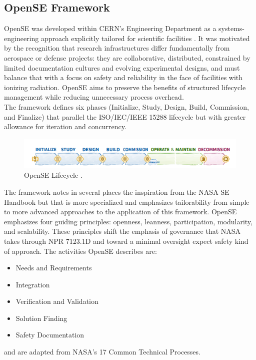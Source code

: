 \subsection{OpenSE Framework}
\label{sub:opense}
OpenSE was developed within CERN’s Engineering Department as a systems-engineering approach explicitly tailored for scientific facilities \cite{cern2016opense,bonnal2018opense}. 
It was motivated by the recognition that research infrastructures differ fundamentally from aerospace or defense projects: they are collaborative, distributed, constrained by limited documentation cultures and evolving experimental designs, and must balance that with a focus on safety and reliability in the face of facilities with ionizing radiation. 
OpenSE aims to preserve the benefits of structured lifecycle management while reducing unnecessary process overhead.\\
The framework defines six phases (Initialize, Study, Design, Build, Commission, and Finalize) that parallel the ISO/IEC/IEEE 15288 lifecycle but with greater allowance for iteration and concurrency. \\
\begin{figure}[h]
  \centering
  \includegraphics[width=0.9\linewidth]{figures/openSElifecycle.png}
  \caption{OpenSE Lifecycle
  \cite{cern2016opense}.}
  \label{fig:openSE_lifecycle}
\end{figure}

The framework notes in several places the inspiration from the NASA SE Handbook but that is more specialized and emphasizes tailorability from simple to more advanced approaches to the application of this framework. \cite{cern2016opense}
OpenSE emphasizes four guiding principles: openness, leanness, participation, modularity, and scalability.\cite{cern2016opense}
These principles shift the emphasis of governance that NASA takes through NPR 7123.1D \cite{npr7123.1D} and toward a minimal oversight expect safety kind of approach. The activities OpenSE describes are:
\begin{itemize}[noitemsep, topsep=0pt]
    \item Needs and Requirements 
    \item Integration
    \item Verification and Validation
    \item Solution Finding
    \item Safety Documentation
\end{itemize}
and are adapted from NASA's 17 Common Technical Processes.
